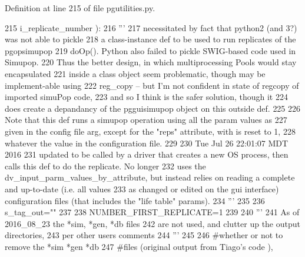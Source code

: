 Definition at line 215 of file pgutilities.\+py.


\begin{DoxyCode}
215                                                 i\_replicate\_number ):
216     \textcolor{stringliteral}{'''}
217 \textcolor{stringliteral}{    necessitated by fact that python2 (and 3?) was not able to pickle }
218 \textcolor{stringliteral}{    a class-instance def to be used to run replicates of the pgopsimupop}
219 \textcolor{stringliteral}{    doOp().  Python also failed to pickle SWIG-based code used in Simupop.}
220 \textcolor{stringliteral}{    Thus the better design, in which  multiprocessing Pools would stay  encapsulated }
221 \textcolor{stringliteral}{    inside a class object seem problematic, though may be implement-able using }
222 \textcolor{stringliteral}{    reg\_copy -- but I'm not confident in state of regcopy of imported simuPop code,}
223 \textcolor{stringliteral}{    and so  I think is the safer solution, though it}
224 \textcolor{stringliteral}{    does create a depandancy of the pgguisimupop object on this outside def.  }
225 \textcolor{stringliteral}{}
226 \textcolor{stringliteral}{    Note that this def runs a simupop operation using all the param values as}
227 \textcolor{stringliteral}{    given in the config file arg, except for the "reps" attribute, with is reset to 1,}
228 \textcolor{stringliteral}{    whatever the value in the configuration file.}
229 \textcolor{stringliteral}{}
230 \textcolor{stringliteral}{    Tue Jul 26 22:01:07 MDT 2016}
231 \textcolor{stringliteral}{    updated to be called by a driver that creates a new OS process, then calls this def to do the
       replicate.  No longer}
232 \textcolor{stringliteral}{    uses the dv\_input\_parm\_values\_by\_attribute, but instead relies on reading a complete and up-to-date
       (i.e. all values}
233 \textcolor{stringliteral}{    as changed or edited on the gui interface) configuration files (that includes the "life table" params).}
234 \textcolor{stringliteral}{    '''}
235 
236     s\_tag\_out=\textcolor{stringliteral}{""}
237 
238     NUMBER\_FIRST\_REPLICATE=1
239 
240     \textcolor{stringliteral}{'''}
241 \textcolor{stringliteral}{    As of 2016\_08\_23 the *sim, *gen, *db files}
242 \textcolor{stringliteral}{    are not used, and clutter up the output directories,}
243 \textcolor{stringliteral}{    per other users comments}
244 \textcolor{stringliteral}{    '''}
245 
246     \textcolor{comment}{#whether or not to remove the *sim *gen *db}
247     \textcolor{comment}{#files (original output from Tiago's code ), }

\end{DoxyCode}
